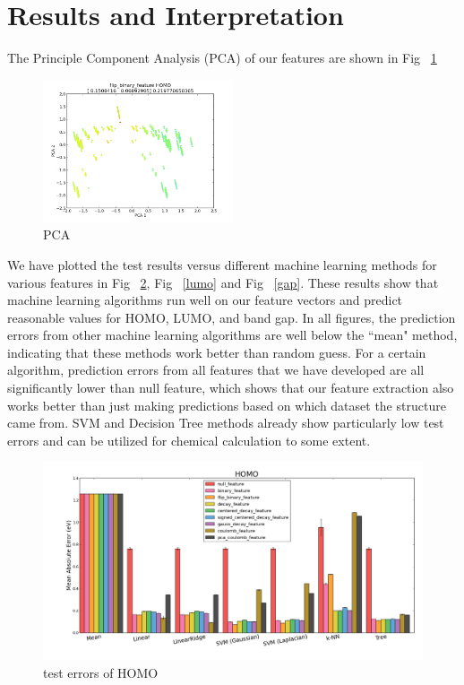 \section{Results and Interpretation}
\noindent The Principle Component Analysis (PCA) of our features are shown in Fig ~\ref{flippca} 

\begin{figure}[H]
\begin{center}
\includegraphics [width=0.5\textwidth]{flip_binary_feature_HOMO.png}
\caption{PCA}\label{flippca}
\end{center}
\end{figure}

We have plotted the test results versus different machine learning methods for various features in Fig ~\ref{homo}, Fig ~\ref{lumo} and Fig ~\ref{gap}. These results show that machine learning algorithms run well on our feature vectors and predict reasonable values for HOMO, LUMO, and band gap. In all figures, the prediction errors from other machine learning algorithms are well below the ``mean" method, indicating that these methods work better than random guess. For a certain algorithm, prediction errors from all features that we have developed are all significantly lower than null feature, which shows that our feature extraction also works better than just making predictions based on which dataset the structure came from. SVM and Decision Tree methods already show particularly low test errors and can be utilized for chemical calculation to some extent.

\begin{figure}[H]
\begin{center}
\includegraphics [width=1\textwidth]{homo_results.png}
\caption{test errors of HOMO}\label{homo}
\end{center}
\end{figure}

